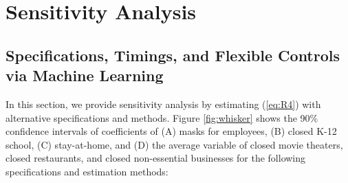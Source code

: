 \documentclass[3p, longtitle]{elsarticle}
\theoremstyle{definition}
\begin{document}
\section{Sensitivity Analysis}\label{sec:sensitivity}

\subsection{Specifications, Timings, and Flexible Controls via Machine Learning}
In this section, we provide sensitivity analysis by estimating (\ref{eq:R4}) with alternative specifications and methods. Figure \ref{fig:whisker} shows  the 90\% confidence intervals of   coefficients of (A) masks for employees, (B)  closed K-12 school, (C) stay-at-home, and (D) the average variable of  closed movie theaters, closed restaurants, and closed non-essential businesses for the following specifications and estimation methods:
\end{document}
